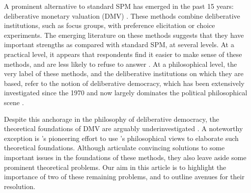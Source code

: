 \documentclass[version=3.21, pagesize, twoside=off, bibliography=totoc, DIV=calc, fontsize=12pt, a4paper, french, english]{scrartcl}
\begin{document}
A prominent alternative to standard SPM has emerged in the past 15 years: deliberative monetary valuation (DMV) \citep{spash_deliberative_2007,bartkowski_economic_2017}. 
These methods combine deliberative institutions, such as focus groups, with preference elicitation or choice experiments. 
The emerging literature on these methods suggests that they have important strengths as compared with standard SPM, at several levels. 
At a practical level, it appears that respondents find it easier to make sense of these methods, and are less likely to refuse to answer \citep{lienhoop_contingent_2007,szabo_reducing_2011}. 
At a philosophical level, the very label of these methods, and the deliberative institutions on which they are based, refer to the notion of deliberative democracy, which has been extensively investigated since the 1970 and now largely dominates the political philosophical scene \citep{chappell_deliberative_2012}.

Despite this anchorage in the philosophy of deliberative democracy, the theoretical foundations of DMV are arguably underinvestigated \citep{bartkowski_economic_2017,bartkowski_beyond_2018,bunse_what_2015,kenter_what_2015}. 
A noteworthy exception is \citet{bartkowski_beyond_2018}'s pioneering effort to use \citet{sen_idea_2009}'s philosophical views to elaborate such theoretical foundations. 
Although \citet{bartkowski_beyond_2018} articulate convincing solutions to some important issues in the foundations of these methods, they also leave aside some prominent theoretical problems. 
Our aim in this article is to highlight the importance of two of these remaining problems, and to outline avenues for their resolution.
\end{document}

